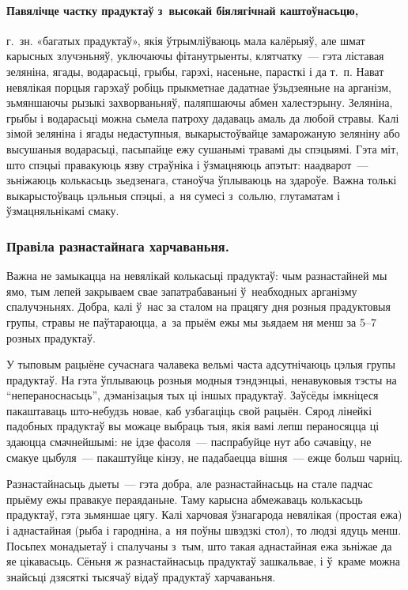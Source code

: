 \paragraph{Павялічце частку прадуктаў з~высокай біялягічнай каштоўнасьцю,} г.~зн. «багатых прадуктаў», якія ўтрымліўваюць мала калёрыяў, але шмат карысных злучэньняў, уключаючы фітанутрыенты, клятчатку~--- гэта ліставая зеляніна, ягады, водарасьці, грыбы, гарэхі, насеньне, парасткі і да т.~п. Нават невялікая порцыя гарэхаў робіць прыкметнае дадатнае ўзьдзеяньне на арганізм, зьмяншаючы рызыкі захворваньняў, паляпшаючы абмен халестэрыну. Зеляніна, грыбы і водарасьці можна сьмела патроху дадаваць амаль да любой стравы. Калі зімой зеляніна і ягады недаступныя, выкарыстоўвайце замарожаную зеляніну або высушаныя водарасьці, пасыпайце ежу сушанымі травамі ды спэцыямі. Гэта міт, што спэцыі правакуюць язву страўніка і ўзмацняюць апэтыт: наадварот~--- зьніжаюць колькасьць зьедзенага, станоўча ўплываюць на здароўе. Важна толькі выкарыстоўваць цэльныя спэцыі, а~ня сумесі з~сольлю, глутаматам і ўзмацняльнікамі смаку.

\subsubsection{Правіла разнастайнага харчаваньня.}
Важна не замыкацца на невялікай колькасьці прадуктаў: чым разнастайней мы ямо, тым лепей закрываем свае запатрабаваньні ў~неабходных арганізму спалучэньнях. Добра, калі ў~нас за сталом на працягу дня розныя прадуктовыя групы, стравы не паўтараюцца, а~за прыём ежы мы зьядаем ня менш за 5--7 розных прадуктаў.

У тыповым рацыёне сучаснага чалавека вельмі часта адсутнічаюць цэлыя групы прадуктаў. На гэта ўплываюць розныя модныя тэндэнцыі, ненавуковыя тэсты на ``непераноснасьць'', дэманізацыя тых ці іншых прадуктаў. Заўсёды імкніцеся пакаштаваць што-небудзь новае, каб узбагаціць свой рацыён. Сярод лінейкі падобных прадуктаў вы можаце выбраць тыя, якія вамі лепш пераносяцца ці здаюцца смачнейшымі: не ідзе фасоля~--- паспрабуйце нут або сачавіцу, не смакуе цыбуля~--- пакаштуйце кінзу, не падабаецца вішня~--- ежце больш чарніц.

Разнастайнасьць дыеты~--- гэта добра, але разнастайнасьць на стале падчас прыёму ежы правакуе пераяданьне. Таму карысна абмежаваць колькасьць прадуктаў, гэта зьмяншае цягу. Калі харчовая ўзнагарода невялікая (простая ежа) і аднастайная (рыба і гародніна, а~ня поўны швэдзкі стол), то людзі ядуць менш. Посьпех монадыетаў і спалучаны з~тым, што такая аднастайная ежа зьніжае да яе цікавасьць. Сёньня ж разнастайнасьць прадуктаў зашкальвае, і ў~краме можна знайсьці дзясяткі тысячаў відаў прадуктаў харчаваньня. 

